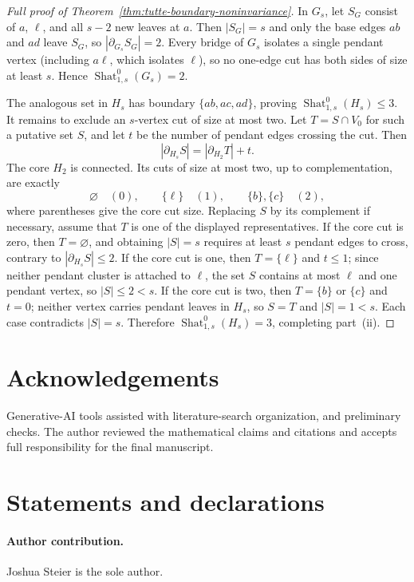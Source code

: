 \documentclass[11pt,letterpaper]{article}
\theoremstyle{plain}
\theoremstyle{definition}
\newcommand{\Shat}{\operatorname{Shat}}
\newcommand{\1}{\mathbf{1}}
\newcommand{\abs}[1]{\left|#1\right|}
\begin{document}
\begin{proof}[Full proof of Theorem~\ref{thm:tutte-boundary-noninvariance}]
In $G_s$, let $S_G$ consist of $a$, $\ell$, and all $s-2$ new leaves at $a$.  Then
$\abs{S_G}=s$ and only the base edges $ab$ and $ad$ leave $S_G$, so
$\abs{\partial_{G_s}S_G}=2$.  Every bridge of $G_s$ isolates a single pendant vertex
(including $a\ell$, which isolates $\ell$), so no one-edge cut has both sides of size at
least $s$.  Hence $\Shat_{1,s}^0(G_s)=2$.

The analogous set in $H_s$ has boundary $\{ab,ac,ad\}$, proving
$\Shat_{1,s}^0(H_s)\le3$.  It remains to exclude an $s$-vertex cut of size at most two.
Let $T=S\cap V_0$ for such a putative set $S$, and let $t$ be the number of pendant
edges crossing the cut.  Then
\[
 \abs{\partial_{H_s}S}=\abs{\partial_{H_2}T}+t.
\]
The core $H_2$ is connected.  Its cuts of size at most two, up to complementation, are
exactly
\[
 \varnothing\quad(0),
 \qquad \{\ell\}\quad(1),
 \qquad \{b\},\{c\}\quad(2),
\]
where parentheses give the core cut size.  Replacing $S$ by its complement if necessary,
assume that $T$ is one of the displayed representatives.  If the core cut is zero, then
$T=\varnothing$, and obtaining $\abs S=s$ requires at least $s$ pendant edges to cross,
contrary to $\abs{\partial_{H_s}S}\le2$.  If the core cut is one, then
$T=\{\ell\}$ and $t\le1$; since neither pendant cluster is attached to $\ell$, the set
$S$ contains at most $\ell$ and one pendant vertex, so $\abs S\le2<s$.  If the core cut
is two, then $T=\{b\}$ or $\{c\}$ and $t=0$; neither vertex carries pendant leaves in
$H_s$, so $S=T$ and $\abs S=1<s$.  Each case contradicts $\abs S=s$.  Therefore
$\Shat_{1,s}^0(H_s)=3$, completing part~(ii).
\end{proof}

\section*{Acknowledgements}
Generative-AI tools assisted with literature-search organization,
and preliminary checks.  The author reviewed the mathematical claims and citations and
accepts full responsibility for the final manuscript.

\section*{Statements and declarations}
\paragraph{Author contribution.}
Joshua Steier is the sole author.
\end{document}
